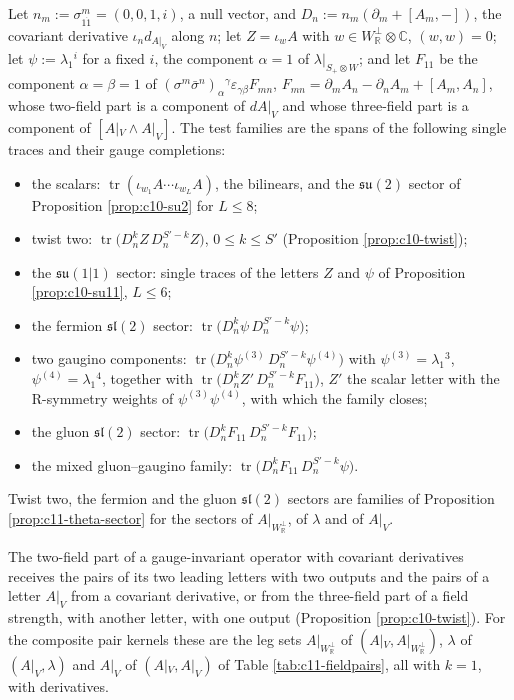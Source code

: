\begin{definition}
\label{def:c11-families}
Let $n_m:=\sigma^m_{1\dot1}=(0,0,1,i)$, a null vector, and $D_n:=n_m(\partial_m+[A_m,-])$, the covariant derivative $\iota_nd_{A|_V}$ along $n$; let $Z=\iota_wA$ with $w\in W_{\mathbb R}^\perp\otimes\mathbb C$, $(w,w)=0$; let $\psi:=\lambda_1{}^i$ for a fixed $i$, the component $\alpha=1$ of $\lambda|_{S_+\otimes W}$; and let $F_{11}$ be the component $\alpha=\beta=1$ of $(\sigma^m\bar\sigma^n)_\alpha{}^\gamma\varepsilon_{\gamma\beta}F_{mn}$, $F_{mn}=\partial_mA_n-\partial_nA_m+[A_m,A_n]$, whose two-field part is a component of $dA|_V$ and whose three-field part is a component of $[A|_V\wedge A|_V]$. The test families are the spans of the following single traces and their gauge completions:
\begin{itemize}
\item the scalars: $\operatorname{tr}(\iota_{w_1}A\cdots\iota_{w_L}A)$, the bilinears, and the $\mathfrak{su}(2)$ sector of Proposition \ref{prop:c10-su2} for $L\le8$;
\item twist two: $\operatorname{tr}\big(D_n^kZ\,D_n^{S'-k}Z\big)$, $0\le k\le S'$ (Proposition \ref{prop:c10-twist});
\item the $\mathfrak{su}(1|1)$ sector: single traces of the letters $Z$ and $\psi$ of Proposition \ref{prop:c10-su11}, $L\le6$;
\item the fermion $\mathfrak{sl}(2)$ sector: $\operatorname{tr}\big(D_n^k\psi\,D_n^{S'-k}\psi\big)$;
\item two gaugino components: $\operatorname{tr}\big(D_n^k\psi^{(3)}\,D_n^{S'-k}\psi^{(4)}\big)$ with $\psi^{(3)}=\lambda_1{}^3$, $\psi^{(4)}=\lambda_1{}^4$, together with $\operatorname{tr}\big(D_n^kZ'\,D_n^{S'-k}F_{11}\big)$, $Z'$ the scalar letter with the R-symmetry weights of $\psi^{(3)}\psi^{(4)}$, with which the family closes;
\item the gluon $\mathfrak{sl}(2)$ sector: $\operatorname{tr}\big(D_n^kF_{11}\,D_n^{S'-k}F_{11}\big)$;
\item the mixed gluon--gaugino family: $\operatorname{tr}\big(D_n^kF_{11}\,D_n^{S'-k}\psi\big)$.
\end{itemize}
Twist two, the fermion and the gluon $\mathfrak{sl}(2)$ sectors are families of Proposition \ref{prop:c11-theta-sector} for the sectors of $A|_{W_{\mathbb R}^\perp}$, of $\lambda$ and of $A|_V$.
\end{definition}

The two-field part of a gauge-invariant operator with covariant derivatives receives the pairs of its two leading letters with two outputs and the pairs of a letter $A|_V$ from a covariant derivative, or from the three-field part of a field strength, with another letter, with one output (Proposition \ref{prop:c10-twist}). For the composite pair kernels these are the leg sets $A|_{W_{\mathbb R}^\perp}$ of $(A|_V,A|_{W_{\mathbb R}^\perp})$, $\lambda$ of $(A|_V,\lambda)$ and $A|_V$ of $(A|_V,A|_V)$ of Table \ref{tab:c11-fieldpairs}, all with $k=1$, with derivatives.

